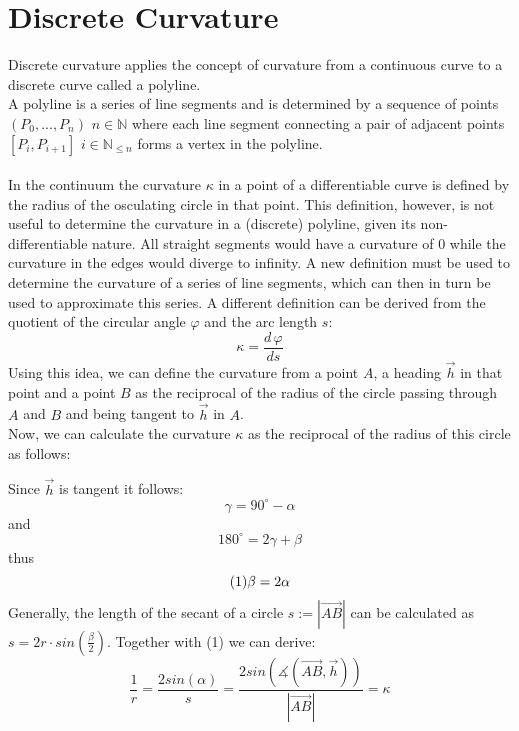 \section{Discrete Curvature}


Discrete curvature applies the concept of curvature from a continuous curve to a discrete curve called a polyline.\\
A polyline is a series of line segments and is determined by a sequence of points $(P_0,...,P_n)$ $n \in \mathbb{N}$ where each line segment connecting a pair of adjacent points $[P_i,P_{i+1}]$ $i \in \mathbb{N}_{\le n}$ forms a vertex in the polyline.\\
\\In the continuum the curvature $\kappa$ in a point of a differentiable curve is defined by the radius of the osculating circle in that point. This definition, however, is not useful to determine the curvature in a (discrete) polyline, given its non-differentiable nature. All straight segments would have a curvature of $0$ while the curvature in the edges would diverge to infinity. A new definition must be used to determine the curvature of a series of line segments, which can then in turn be used to approximate this series. A different definition can be derived from the quotient of the circular angle $\varphi$ and the arc length $s$:
$$\kappa  =  {\frac{{d\,\varphi}}{{ds}}}$$
Using this idea, we can define the curvature from a point $A$, a heading  $\vec h$ in that point and a point $B$ as the reciprocal of the radius of the circle passing through $A$ and $B$ and being tangent to  $\vec h$ in $A$.
 \\ Now, we can calculate the curvature $\kappa$ as the reciprocal of the radius of this circle as follows:

Since $\vec h$ is tangent it follows: $$\gamma=90^{\circ} - \alpha$$ and $$180^{\circ}=2\gamma+\beta$$ thus $$(1) \space \beta = 2 \alpha$$
Generally, the length of the secant of a circle $s:=|\vec{AB}|$ can be calculated as
$s = 2r \cdot  sin(\frac{\beta}{2})$. Together with (1) we can derive:
$$\frac{1}{r} = \frac{2sin(\alpha)}{s} = \frac{2sin(\measuredangle(\vec{AB},\vec h))}{|\vec{AB}|} = \kappa$$\\

